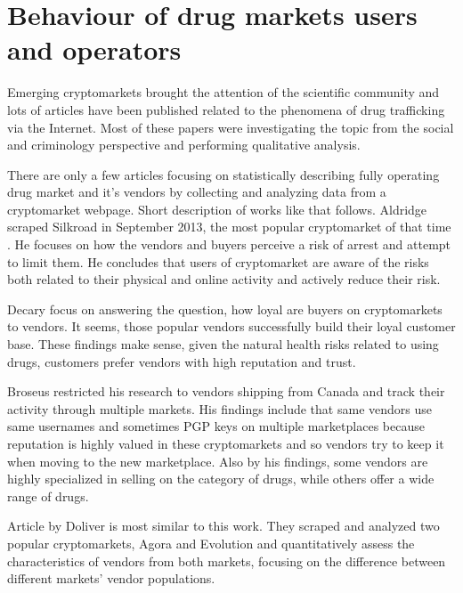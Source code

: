 \documentclass[
  digital, %
  table,   %
  lof,     %
  lot,     %
  oneside
]{fithesis3}
\begin{document}
\section{Behaviour of drug markets users and operators}

Emerging cryptomarkets brought the attention of the scientific community
and lots of articles have been published related to the phenomena of drug trafficking via the Internet.
Most of these papers were investigating the topic from the social
and criminology perspective and performing qualitative analysis.
\parencite{aldridge2014not}
\parencite{barratt2014use}
\parencite{christin2013traveling}
\parencite{dolliver2015criminogenic}
\parencite{van2013silk}
\parencite{walsh2011drugs}
\parencite{martin2014lost}

There are only a few articles focusing on statistically describing fully operating drug market and it's vendors
by collecting and analyzing data from a cryptomarket webpage. Short description of works like that follows.
Aldridge \parencite{aldridge2017delivery} scraped Silkroad in September 2013, the most popular cryptomarket of that time
.
He focuses on how the vendors and buyers perceive a risk of arrest and attempt to limit them.
He concludes that users of cryptomarket are aware of the risks both related to their physical and online activity
and actively reduce their risk.

Decary \parencite{decary2017repeat} focus on answering the question, how loyal are buyers on cryptomarkets to vendors. It seems, those popular vendors successfully build their loyal
customer base. These findings make sense, given the natural health risks related to using drugs,
customers prefer vendors with high reputation and trust.

Broseus \parencite{broseus2016studying} restricted his research to vendors shipping from Canada
and track their activity through multiple markets. His findings include that same vendors
use same usernames and sometimes PGP keys on multiple marketplaces because reputation
is highly valued in these cryptomarkets and so vendors try to keep it when moving to the new marketplace.
Also by his findings, some vendors are highly specialized in selling on the category of drugs, while others offer a wide range of drugs.

Article by Doliver \parencite{dolliver2016characteristics} is most similar to this work.
They scraped and analyzed two popular cryptomarkets, Agora and Evolution and quantitatively assess
the characteristics of vendors from both markets, focusing on the difference
 between different markets' vendor populations.
\end{document}
